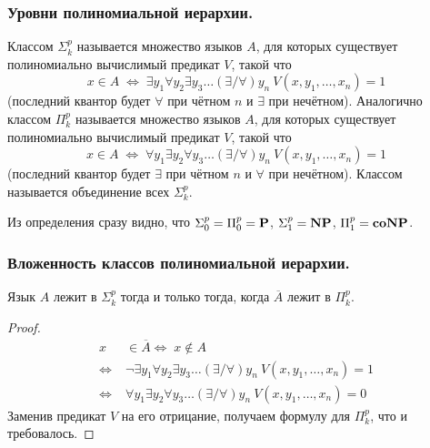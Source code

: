 \subsubsection{Уровни полиномиальной иерархии.}

\begin{definition}
Классом \textbf{$\Sigma_k^p$}
называется множество языков $A$, для которых
существует полиномиально вычислимый предикат $V$, такой что
    $$x \in A \; \Leftrightarrow \; \exists y_1 \forall y_2 \exists y_3 \ldots (\exists / \forall) y_n \ V(x, y_1,\ldots ,x_n) = 1$$
(последний квантор будет $\forall$ при чётном $n$ и $\exists$ при нечётном).   Аналогично классом \textbf{$\Pi_k^p$}
называется множество языков $A$, для которых
существует полиномиально вычислимый предикат $V$, такой что
    $$x \in A \; \Leftrightarrow \; \forall y_1 \exists y_2 \forall y_3 \ldots (\exists / \forall) y_n \ V(x, y_1,\ldots ,x_n) = 1$$
(последний квантор будет $\exists$ при чётном $n$ и $\forall$ при нечётном).
Классом \ph
называется объединение всех \textbf{$\Sigma_k^p$}.
\end{definition}

\begin{note}
Из определения сразу видно, что $\Sigma_0^p = \Pi_0^p = \textbf{P}$, $\Sigma_1^p = \textbf{NP}$, $\Pi_1^p = \textbf{coNP}$. 
\end{note}

\subsubsection{Вложенность классов полиномиальной иерархии.}

\begin{statement}
Язык $A$ лежит в $\Sigma_k^p$ тогда и только тогда, когда $\overline{A}$ лежит в $\Pi_k^p$.
\end{statement}

\begin{proof}
\begin{align*}
    x & \in \overline{A} \Leftrightarrow \; x \notin A \\
    \Leftrightarrow \; & \neg \exists y_1 \forall y_2 \exists y_3 \ldots (\exists / \forall) y_n \ V(x, y_1,\ldots ,x_n) = 1 \\
    \Leftrightarrow \; & \forall y_1 \exists y_2 \forall y_3 \ldots (\exists / \forall) y_n \ V(x, y_1,\ldots ,x_n) = 0 
\end{align*}
 Заменив предикат $V$ на его отрицание, получаем формулу для $\Pi_k^p$, что и требовалось.
\end{proof}

